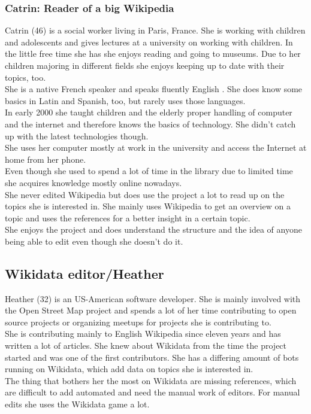 \documentclass[11pt]{article}
\begin{document}
\subsubsection{Catrin: Reader of a big Wikipedia}
Catrin (46) is a social worker living in Paris, France. She is working with children and adolescents and gives lectures at a university on working with children. In the little free time she has she enjoys reading and going to museums. Due to her children majoring in different fields she enjoys keeping up to date with their topics, too. \\
She is a native French speaker and speaks fluently English . She does know some basics in Latin and Spanish, too, but rarely uses those languages. \\
In early 2000 she taught children and the elderly proper handling of computer and the internet and therefore knows the basics of technology. She didn't catch up with the latest technologies though. \\
She uses her computer mostly at work in the university and access the Internet at home from her phone. \\
Even though she used to spend a lot of time in the library due to limited time she acquires knowledge mostly online nowadays. \\
She never edited Wikipedia but does use the project a lot to read up on the topics she is interested in. She mainly uses Wikipedia to get an overview on a topic and uses the references for a better insight in a certain topic. \\
She enjoys the project and does understand the structure and the idea of anyone being able to edit even though she doesn't do it. \\


\subsection{Wikidata editor/Heather}
Heather (32) is an US-American software developer. She is mainly involved with the Open Street Map project and spends a lot of her time contributing to open source projects or organizing meetups for projects she is contributing to. \\
She is contributing mainly to English Wikipedia since eleven years and has written a lot of articles. 
She knew about Wikidata from the time the project started and was one of the first contributors. She has a differing amount of bots running on Wikidata, which add data on topics she is interested in. \\
The thing that bothers her the most on Wikidata are missing references, which are difficult to add automated and need the manual work of editors. For manual edits she uses the Wikidata game a lot. 
\end{document}
